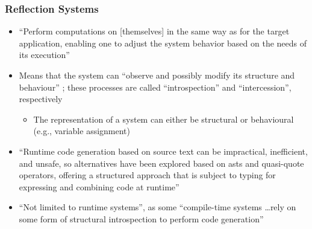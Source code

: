 \subsubsection{Reflection Systems \citep[p.~113:7-9]{lilis_survey_2019}}
\begin{itemize}
      \item ``Perform computations on [themselves] in the same way as for the
            target application, enabling one to adjust the system behavior
            based on the needs of its execution''
            \citep[p.~113:7]{lilis_survey_2019}
      \item Means that the system can ``observe and possibly modify its
            structure and behaviour'' \citep[p.~22]{stuikys_taxonomy_2013};
            these processes are called ``introspection'' and ``intercession'',
            respectively \citep[p.~113:7]{lilis_survey_2019}
            \begin{itemize}
                  \item The representation of a system can either be structural
                        or behavioural (e.g., variable assignment)
                        \citep[p.~113:7]{lilis_survey_2019}
            \end{itemize}
      \item ``Runtime code generation based on source text can be impractical,
            inefficient, and unsafe, so alternatives have been explored based
            on \acsp{ast} and quasi-quote operators, offering a structured approach
            that is subject to typing for expressing and combining code at
            runtime'' \citep[p.~113:8]{lilis_survey_2019}
      \item ``Not limited to runtime systems'', as some ``compile-time systems
            \dots rely on some form of structural introspection to perform code
            generation'' \citep[p.~113:9]{lilis_survey_2019}
\end{itemize}

